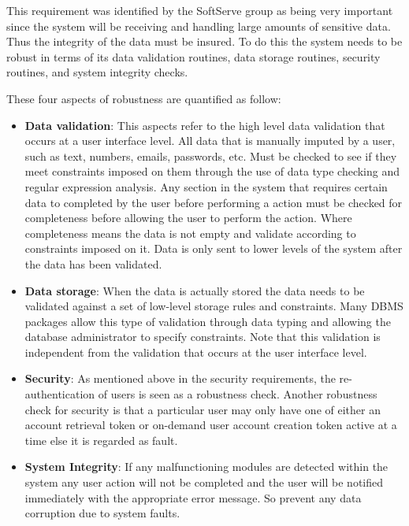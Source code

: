 \begin{flushleft}

This requirement was identified by the SoftServe group as being very important since the system will be receiving and handling large amounts of sensitive data. Thus the integrity of the data must be insured. To do this the system needs to be robust in terms of its data validation routines, data storage routines, security routines, and system integrity checks. 

These four aspects of robustness are quantified as follow:
\begin{itemize}
\item \textbf{Data validation}: This aspects refer to the high level data validation that occurs at a user interface level. All data that is manually imputed by a user, such as text, numbers, emails, passwords, etc. Must be checked to see if they meet constraints imposed on them through the use of data type checking and regular expression analysis. Any section in the system that requires certain data to completed by the user before performing a action must be checked for completeness before allowing the user to perform the action. Where completeness means the data is not empty and validate according to constraints imposed on it. Data is only sent to lower levels of the system after the data has been validated.
\item \textbf{Data storage}: When the data is actually stored the data needs to be validated against a set of low-level storage rules and constraints. Many DBMS packages allow this type of validation through data typing and allowing the database administrator to specify constraints. Note that this validation is independent from the validation that occurs at the user interface level.
\item \textbf{Security}: As mentioned above in the security requirements, the re-authentication of users is seen as a robustness check. Another robustness check for security is that a particular user may only have one of either an account retrieval token or on-demand user account creation token active at a time else it is regarded as fault.
\item \textbf{System Integrity}: If any malfunctioning modules are detected within the system any user action will not be completed and the user will be notified immediately with the appropriate error message. So prevent any data corruption due to system faults.
\end{itemize}
\vspace{0.1in}


\end{flushleft}
